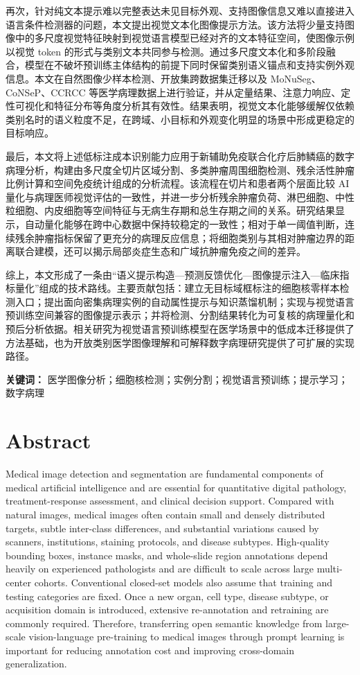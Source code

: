 再次，针对纯文本提示难以完整表达未见目标外观、支持图像信息又难以直接进入语言条件检测器的问题，本文提出视觉文本化图像提示方法。该方法将少量支持图像中的多尺度视觉特征映射到视觉语言模型已经对齐的文本特征空间，使图像示例以视觉 token 的形式与类别文本共同参与检测。通过多尺度文本化和多阶段融合，模型在不破坏预训练主体结构的前提下同时保留类别语义锚点和支持实例外观信息。本文在自然图像少样本检测、开放集跨数据集迁移以及 MoNuSeg、CoNSeP、CCRCC 等医学病理数据上进行验证，并从定量结果、注意力响应、定性可视化和特征分布等角度分析其有效性。结果表明，视觉文本化能够缓解仅依赖类别名时的语义粒度不足，在跨域、小目标和外观变化明显的场景中形成更稳定的目标响应。

最后，本文将上述低标注成本识别能力应用于新辅助免疫联合化疗后肺鳞癌的数字病理分析，构建由多尺度全切片区域分割、多类肿瘤周围细胞检测、残余活性肿瘤比例计算和空间免疫统计组成的分析流程。该流程在切片和患者两个层面比较 AI 量化与病理医师视觉评估的一致性，并进一步分析残余肿瘤负荷、淋巴细胞、中性粒细胞、内皮细胞等空间特征与无病生存期和总生存期之间的关系。研究结果显示，自动量化能够在跨中心数据中保持较稳定的一致性；相对于单一阈值判断，连续残余肿瘤指标保留了更充分的病理反应信息；将细胞类别与其相对肿瘤边界的距离联合建模，还可以揭示局部炎症生态和广域抗肿瘤免疫之间的差异。

综上，本文形成了一条由“语义提示构造—预测反馈优化—图像提示注入—临床指标量化”组成的技术路线。主要贡献包括：建立无目标域框标注的细胞核零样本检测入口；提出面向密集病理实例的自动属性提示与知识蒸馏机制；实现与视觉语言预训练空间兼容的图像提示表示；并将检测、分割结果转化为可复核的病理量化和预后分析依据。相关研究为视觉语言预训练模型在医学场景中的低成本迁移提供了方法基础，也为开放类别医学图像理解和可解释数字病理研究提供了可扩展的实现路径。

\noindent\textbf{关键词：} 医学图像分析；细胞核检测；实例分割；视觉语言预训练；提示学习；数字病理

\chapter*{Abstract}
Medical image detection and segmentation are fundamental components of medical artificial intelligence and are essential for quantitative digital pathology, treatment-response assessment, and clinical decision support. Compared with natural images, medical images often contain small and densely distributed targets, subtle inter-class differences, and substantial variations caused by scanners, institutions, staining protocols, and disease subtypes. High-quality bounding boxes, instance masks, and whole-slide region annotations depend heavily on experienced pathologists and are difficult to scale across large multi-center cohorts. Conventional closed-set models also assume that training and testing categories are fixed. Once a new organ, cell type, disease subtype, or acquisition domain is introduced, extensive re-annotation and retraining are commonly required. Therefore, transferring open semantic knowledge from large-scale vision-language pre-training to medical images through prompt learning is important for reducing annotation cost and improving cross-domain generalization.

